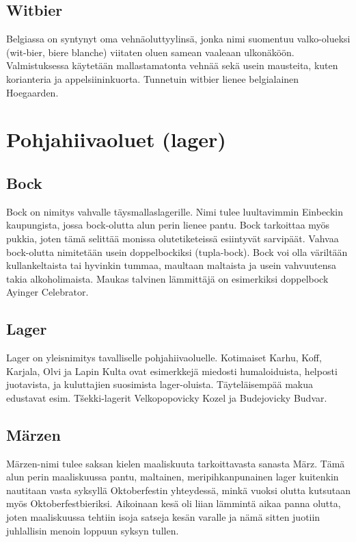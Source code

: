\documentclass[a4paper,11pt]{report}
\begin{document}
\subsection*{Witbier}

Belgiassa on syntynyt oma vehnäoluttyylinsä, jonka nimi suomentuu valko-olueksi (wit-bier, biere blanche) viitaten oluen samean vaaleaan ulkonäköön. Valmistuksessa käytetään mallastamatonta vehnää sekä usein mausteita, kuten korianteria ja appelsiininkuorta. Tunnetuin witbier lienee belgialainen Hoegaarden.

\section{Pohjahiivaoluet (lager)}

\subsection*{Bock}

Bock on nimitys vahvalle täysmallaslagerille. Nimi tulee luultavimmin Einbeckin kaupungista, jossa bock-olutta alun perin lienee pantu. Bock tarkoittaa myös pukkia, joten tämä selittää monissa olutetiketeissä esiintyvät sarvipäät. Vahvaa bock-olutta nimitetään usein doppelbockiksi (tupla-bock). Bock voi olla väriltään kullankeltaista tai hyvinkin tummaa, maultaan maltaista ja usein vahvuutensa takia alkoholimaista. Maukas talvinen lämmittäjä on esimerkiksi doppelbock Ayinger Celebrator.

\subsection*{Lager}

Lager on yleisnimitys tavalliselle pohjahiivaoluelle. Kotimaiset Karhu, Koff, Karjala, Olvi ja Lapin Kulta ovat esimerkkejä miedosti humaloiduista, helposti juotavista, ja kuluttajien suosimista lager-oluista. Täyteläisempää makua edustavat esim. Tšekki-lagerit Velkopopovicky Kozel ja Budejovicky Budvar.


\subsection*{Märzen}

Märzen-nimi tulee saksan kielen maaliskuuta tarkoittavasta sanasta März. Tämä alun perin maaliskuussa pantu, maltainen, meripihkanpunainen lager kuitenkin nautitaan vasta syksyllä Oktoberfestin yhteydessä, minkä vuoksi olutta kutsutaan myös Oktoberfestbieriksi. Aikoinaan kesä oli liian lämmintä aikaa panna olutta, joten maaliskuussa tehtiin isoja satseja kesän varalle ja nämä sitten juotiin juhlallisin menoin loppuun syksyn tullen.
\end{document}
